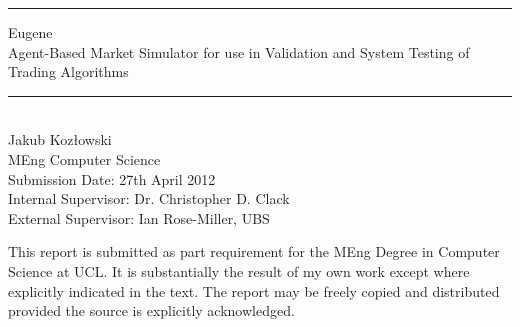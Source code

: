\begin{titlepage}
\begin{center}
\vspace*{\fill}
\rule{\linewidth}{0.5mm}
\Huge{Eugene} \\
\LARGE{Agent-Based Market Simulator for use in Validation and System Testing of Trading Algorithms}
\rule{\linewidth}{0.5mm}\\[2cm]

\large{Jakub Koz\l{}owski \\
MEng Computer Science \\
Submission Date: 27th April 2012 \\
Internal Supervisor: Dr. Christopher D. Clack \\
External Supervisor: Ian Rose-Miller, UBS}
\vspace*{\fill}


\null
\vfill
\normalsize{This report is submitted as part requirement for the MEng Degree in Computer Science at UCL. It is substantially the result of my own work except where explicitly indicated in the text. The report may be freely copied and distributed provided the source is explicitly acknowledged.}
\end{center}
\end{titlepage}


